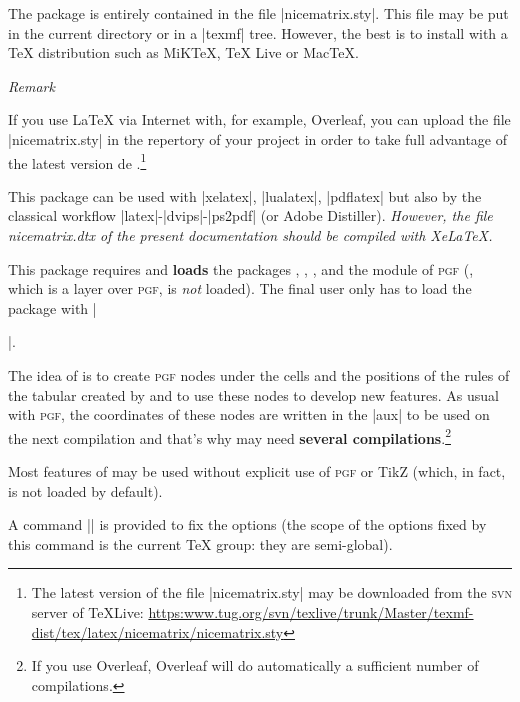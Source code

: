 \documentclass[dvipsnames]{article}%
\begin{document}
\vspace{1cm}
The package  is entirely contained in the file
|nicematrix.sty|. This file may be put in the current directory or in a
|texmf| tree. However, the best is to install  with a TeX
distribution such as MiKTeX, TeX Live or MacTeX.

\medskip
\emph{Remark}\par\nobreak

If you use LaTeX via Internet with, for example, Overleaf, you
can upload the file |nicematrix.sty| in the repertory of your 
project in order to take full advantage of the latest version de
.\footnote{The latest version of the file
|nicematrix.sty| may be downloaded from the \textsc{svn} server of
TeXLive:\newline
\small
\url{https:www.tug.org/svn/texlive/trunk/Master/texmf-dist/tex/latex/nicematrix/nicematrix.sty}}

\medskip
This package can be used with |xelatex|, |lualatex|, |pdflatex| but also by
the classical workflow |latex|-|dvips|-|ps2pdf| (or Adobe Distiller).
\textsl{However, the file nicematrix.dtx of the present documentation should
be compiled with XeLaTeX.}

\medskip
This package requires and \textbf{loads} the packages ,
, ,  and the module  of
\textsc{pgf} (, which is a layer over \textsc{pgf}, is \emph{not}
loaded). The final user only has to load the package with
|\usepackage{nicematrix}|.


\medskip
The idea of  is to create \textsc{pgf} nodes under the cells
and the positions of the rules of the tabular created by  and to
use these nodes to develop new features. As usual with \textsc{pgf}, the
coordinates of these nodes are written in the |aux| to be used on the next
compilation and that's why  may need \textbf{several
compilations}.\footnote{If you use Overleaf, Overleaf will do automatically
a sufficient number of compilations.}

\medskip
Most features of  may be used without explicit use of
\textsc{pgf} or TikZ (which, in fact, is not loaded by default).

\medskip
{}
A command |\NiceMatrixOptions| is provided to fix the options (the
scope of the options fixed by this command is the current TeX group: they are
semi-global). 
\end{document}
